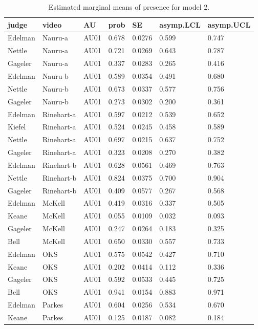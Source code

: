 \documentclass{monashthesis}
\begin{document}
\begin{center}
\begin{longtable}{lllllll}
\caption{\label{tab:result-2}Estimated marginal means of presence for model 2. }\\
\toprule
judge & video & AU & prob & SE & asymp.LCL & asymp.UCL \\
\midrule
\endhead
\bottomrule
\endfoot
Edelman & Nauru-a & AU01 & 0.678 & 0.0276 & 0.599 & 0.747 \\
Nettle & Nauru-a & AU01 & 0.721 & 0.0269 & 0.643 & 0.787 \\
Gageler & Nauru-a & AU01 & 0.337 & 0.0283 & 0.265 & 0.416 \\
Edelman & Nauru-b & AU01 & 0.589 & 0.0354 & 0.491 & 0.680 \\
Nettle & Nauru-b & AU01 & 0.673 & 0.0337 & 0.577 & 0.756 \\
Gageler & Nauru-b & AU01 & 0.273 & 0.0302 & 0.200 & 0.361 \\
Edelman & Rinehart-a & AU01 & 0.597 & 0.0212 & 0.539 & 0.652 \\
Kiefel & Rinehart-a & AU01 & 0.524 & 0.0245 & 0.458 & 0.589 \\
Nettle & Rinehart-a & AU01 & 0.697 & 0.0215 & 0.637 & 0.752 \\
Gageler & Rinehart-a & AU01 & 0.323 & 0.0208 & 0.270 & 0.382 \\
Edelman & Rinehart-b & AU01 & 0.628 & 0.0561 & 0.469 & 0.763 \\
Nettle & Rinehart-b & AU01 & 0.824 & 0.0375 & 0.700 & 0.904 \\
Gageler & Rinehart-b & AU01 & 0.409 & 0.0577 & 0.267 & 0.568 \\
Edelman & McKell & AU01 & 0.419 & 0.0316 & 0.337 & 0.505 \\
Keane & McKell & AU01 & 0.055 & 0.0109 & 0.032 & 0.093 \\
Gageler & McKell & AU01 & 0.247 & 0.0264 & 0.183 & 0.325 \\
Bell & McKell & AU01 & 0.650 & 0.0330 & 0.557 & 0.733 \\
Edelman & OKS & AU01 & 0.575 & 0.0542 & 0.427 & 0.710 \\
Keane & OKS & AU01 & 0.202 & 0.0414 & 0.112 & 0.336 \\
Gageler & OKS & AU01 & 0.592 & 0.0533 & 0.445 & 0.725 \\
Bell & OKS & AU01 & 0.941 & 0.0154 & 0.883 & 0.971 \\
Edelman & Parkes & AU01 & 0.604 & 0.0256 & 0.534 & 0.670 \\
Keane & Parkes & AU01 & 0.125 & 0.0187 & 0.082 & 0.184 \\

\end{longtable}
\end{center}
\end{document}
